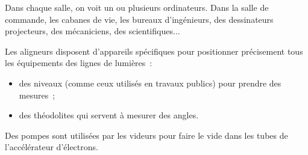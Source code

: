 				Dans chaque salle, on voit un ou plusieurs ordinateurs. Dans la salle de commande, les cabanes de vie, les bureaux d'ingénieurs, des dessinateurs projecteurs, des mécaniciens, des scientifiques... 

				Les aligneurs disposent d'appareils spécifiques pour positionner précisement tous les équipements des lignes de lumières~:
				\begin{itemize}	
				 \item des niveaux (comme ceux utilisés en travaux publics) pour prendre des mesures~;
				 \item des théodolites qui servent à mesurer des angles.
				\end{itemize}

				Des pompes sont utilisées par les videurs pour faire le vide dans les tubes de l'accélérateur d'électrons.





%
%
